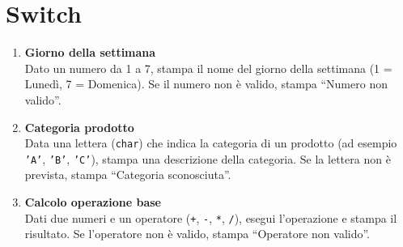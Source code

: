 \documentclass{article}
\begin{document}
\section{Switch}

\begin{enumerate}
    \item \textbf{Giorno della settimana} \\
    Dato un numero da 1 a 7, stampa il nome del giorno della settimana (1 = Lunedì, 7 = Domenica). Se il numero non è valido, stampa ``Numero non valido''.
    
    \item \textbf{Categoria prodotto} \\
    Data una lettera (\texttt{char}) che indica la categoria di un prodotto (ad esempio \texttt{'A'}, \texttt{'B'}, \texttt{'C'}), stampa una descrizione della categoria. Se la lettera non è prevista, stampa ``Categoria sconosciuta''.
    
    \item \textbf{Calcolo operazione base} \\
    Dati due numeri e un operatore (\texttt{+}, \texttt{-}, \texttt{*}, \texttt{/}), esegui l'operazione e stampa il risultato. Se l'operatore non è valido, stampa ``Operatore non valido''.

\end{enumerate}
\end{document}

